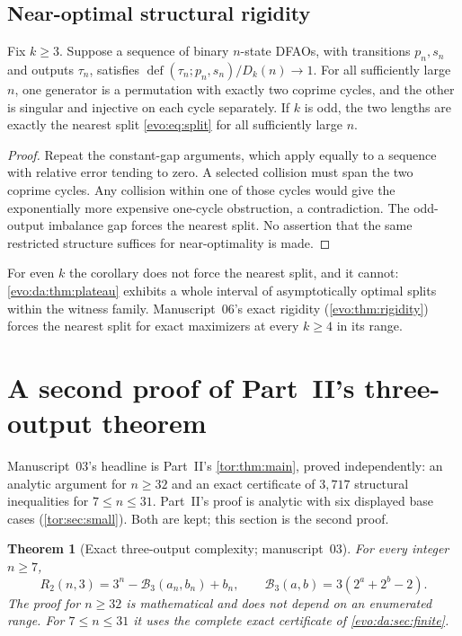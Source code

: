 \documentclass[11pt,a4paper]{article}
\numberwithin{equation}{section}
\newtheorem{theorem}{Theorem}[section]
\theoremstyle{definition}
\theoremstyle{remark}
\newcommand{\Bip}{\mathcal B}
\newcommand{\defi}{\operatorname{def}}
\begin{document}
\subsection{Near-optimal structural rigidity}

\begin{corollary}[Manuscript~03]\label{evo:da:cor:nearoptimal}
Fix $k\ge3$. Suppose a sequence of binary $n$-state DFAOs, with transitions
$p_n,s_n$ and outputs $\tau_n$, satisfies
$\defi(\tau_n;p_n,s_n)/D_k(n)\to1$. For all sufficiently large $n$, one
generator is a permutation with exactly two coprime cycles, and the other is
singular and injective on each cycle separately. If $k$ is odd, the two
lengths are exactly the nearest split \eqref{evo:eq:split} for all
sufficiently large $n$.
\end{corollary}
\begin{proof}
Repeat the constant-gap arguments, which apply equally to a sequence with
relative error tending to zero. A selected collision must span the two coprime
cycles. Any collision within one of those cycles would give the exponentially
more expensive one-cycle obstruction, a contradiction. The odd-output
imbalance gap forces the nearest split. No assertion that the same
restricted structure suffices for near-optimality is made.
\end{proof}

For even $k$ the corollary does not force the nearest split, and it cannot:
\cref{evo:da:thm:plateau} exhibits a whole interval of asymptotically optimal
splits within the witness family. Manuscript~06's exact rigidity
(\cref{evo:thm:rigidity}) forces the nearest split for exact maximizers at
every $k\ge4$ in its range.

\section{A second proof of Part~II's three-output theorem}\label{evo:sec:three}

Manuscript~03's headline is Part~II's \cref{tor:thm:main}, proved
independently: an analytic argument for $n\ge32$ and an exact certificate of
$3{,}717$ structural inequalities for $7\le n\le31$. Part~II's proof is
analytic with six displayed base cases (\cref{tor:sec:small}). Both are
kept; this section is the second proof.

\begin{theorem}[Exact three-output complexity; manuscript~03]\label{evo:da:thm:main3}
For every integer $n\ge7$,
\begin{equation}\label{evo:da:eq:main3}
 R_2(n,3)=3^n-\Bip_3(a_n,b_n)+b_n,\qquad \Bip_3(a,b)=3(2^a+2^b-2).
\end{equation}
The proof for $n\ge32$ is mathematical and does not depend on an enumerated
range. For $7\le n\le31$ it uses the complete exact certificate of
\cref{evo:da:sec:finite}.
\end{theorem}
\end{document}
